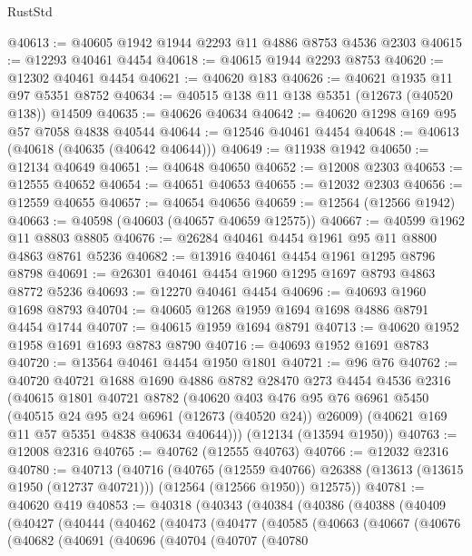 \begin{lexlean}{RustStd}
\begin{coremodule}
@40613 := @40605 @1942 @1944 @2293 @11 @4886 @8753 @4536 @2303
@40615 := @12293 @40461 @4454
@40618 := @40615 @1944 @2293 @8753
@40620 := @12302 @40461 @4454
@40621 := @40620 @183
@40626 := @40621 @1935 @11 @97 @5351 @8752
@40634 := @40515 @138 @11 @138 @5351 (@12673 (@40520 @138)) @14509
@40635 := @40626 @40634
@40642 := @40620 @1298 @169 @95 @57 @7058 @4838 @40544
@40644 := @12546 @40461 @4454
@40648 := @40613 (@40618 (@40635 (@40642 @40644)))
@40649 := @11938 @1942
@40650 := @12134 @40649
@40651 := @40648 @40650
@40652 := @12008 @2303
@40653 := @12555 @40652
@40654 := @40651 @40653
@40655 := @12032 @2303
@40656 := @12559 @40655
@40657 := @40654 @40656
@40659 := @12564 (@12566 @1942)
@40663 := @40598 (@40603 (@40657 @40659 @12575))
@40667 := @40599 @1962 @11 @8803 @8805
@40676 := @26284 @40461 @4454 @1961 @95 @11 @8800 @4863 @8761 @5236
@40682 := @13916 @40461 @4454 @1961 @1295 @8796 @8798
@40691 := @26301 @40461 @4454 @1960 @1295 @1697 @8793 @4863 @8772 @5236
@40693 := @12270 @40461 @4454
@40696 := @40693 @1960 @1698 @8793
@40704 := @40605 @1268 @1959 @1694 @1698 @4886 @8791 @4454 @1744
@40707 := @40615 @1959 @1694 @8791
@40713 := @40620 @1952 @1958 @1691 @1693 @8783 @8790
@40716 := @40693 @1952 @1691 @8783
@40720 := @13564 @40461 @4454 @1950 @1801
@40721 := @96 @76
@40762 := @40720
    @40721
    @1688
    @1690
    @4886
    @8782
    @28470
    @273
    @4454
    @4536
    @2316
    (@40615
      @1801
      @40721
      @8782
      (@40620
        @403
        @476
        @95
        @76
        @6961
        @5450
        (@40515 @24 @95 @24 @6961 (@12673 (@40520 @24)) @26009)
        (@40621 @169 @11 @57 @5351 @4838 @40634 @40644)))
    (@12134 (@13594 @1950))
@40763 := @12008 @2316
@40765 := @40762 (@12555 @40763)
@40766 := @12032 @2316
@40780 := @40713
    (@40716
      (@40765
        (@12559 @40766)
        @26388
        (@13613 (@13615 @1950 (@12737 @40721)))
        (@12564 (@12566 @1950))
        @12575))
@40781 := @40620 @419
@40853 := @40318
    (@40343
      (@40384
        (@40386
          (@40388
            (@40409
              (@40427
                (@40444
                  (@40462
                    (@40473
                      (@40477
                        (@40585
                          (@40663
                            (@40667
                              (@40676
                                (@40682
                                  (@40691
                                    (@40696
                                      (@40704
                                        (@40707
                                          (@40780

\end{coremodule}
\end{lexlean}
